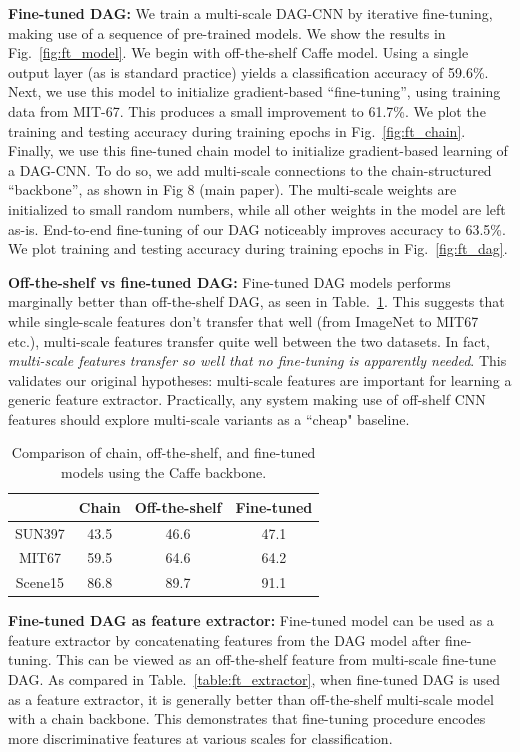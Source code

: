 \documentclass[10pt,twocolumn,letterpaper]{article}
\begin{document}
{\bf Fine-tuned DAG:} We train a multi-scale DAG-CNN by iterative fine-tuning, making use of a sequence of pre-trained models. We show the results in Fig.~\ref{fig:ft_model}. We begin with off-the-shelf Caffe model. Using a single output layer (as is standard practice) yields a classification accuracy of 59.6\%. Next, we use this model to initialize gradient-based ``fine-tuning'', using training data from MIT-67. This produces a small improvement to 61.7\%. We plot the training and testing accuracy during training epochs in Fig.~\ref{fig:ft_chain}. Finally, we use this fine-tuned chain model to initialize gradient-based learning of a DAG-CNN. To do so, we add multi-scale connections to the chain-structured ``backbone'', as shown in Fig 8 (main paper). The multi-scale weights are initialized to small random numbers, while all other weights in the model are left as-is. End-to-end fine-tuning of our DAG noticeably improves accuracy to 63.5\%. We plot training and testing accuracy during training epochs in Fig.~\ref{fig:ft_dag}. 


{\bf Off-the-shelf vs fine-tuned DAG:} Fine-tuned DAG models performs marginally better than off-the-shelf DAG, as seen in Table.~\ref{table:ft_vs_otf}. This suggests that while single-scale features don't transfer that well (from ImageNet to MIT67 etc.), multi-scale features transfer quite well between the two datasets. In fact, {\em multi-scale features transfer so well that no fine-tuning is apparently needed}. This validates our original hypotheses: multi-scale features are important for learning a generic feature extractor. Practically, any system making use of off-shelf CNN features should explore multi-scale variants as a ``cheap" baseline.

\begin{table}[htbp]
\begin{center}
\begin{tabular}{|c|c|c|c|}
\hline
 & Chain &  Off-the-shelf & Fine-tuned\\
\hline
SUN397 & 43.5 & 46.6 & 47.1 \\
MIT67 & 59.5 & 64.6 & 64.2 \\
Scene15 & 86.8 & 89.7 & 91.1 \\
\hline
\end{tabular}
\end{center}
\caption{Comparison of chain, off-the-shelf, and fine-tuned models using the Caffe backbone.}
\label{table:ft_vs_otf}
\end{table}

{\bf Fine-tuned DAG as feature extractor:} Fine-tuned model can be used as a feature extractor by concatenating features from the DAG model after fine-tuning. This can be viewed as an off-the-shelf feature from multi-scale fine-tune DAG. As compared in Table.~\ref{table:ft_extractor}, when fine-tuned DAG is used as a feature extractor, it is generally better than off-the-shelf multi-scale model with a chain backbone. This demonstrates that fine-tuning procedure encodes more discriminative features at various scales for classification. 
\end{document}
